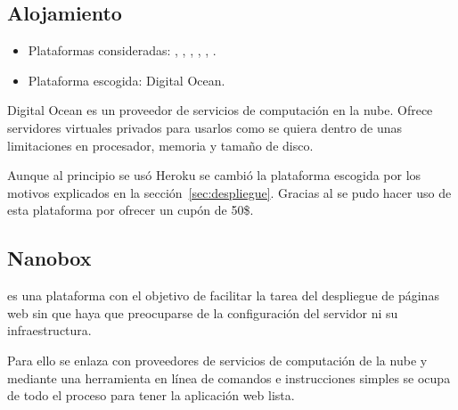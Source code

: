 \subsection{Alojamiento}

\begin{itemize}
	\tightlist
	\item Plataformas consideradas:
	,
	,
	,
	,
	,
	.
	\item Plataforma escogida: Digital Ocean.
\end{itemize}

Digital Ocean es un proveedor de servicios de computación en la nube. Ofrece
servidores virtuales privados para usarlos como se quiera dentro de unas
limitaciones en procesador, memoria y tamaño de disco.

Aunque al principio se usó Heroku se cambió la plataforma escogida por los
motivos explicados en la sección~\ref{sec:despliegue}. Gracias al
 se pudo
hacer uso de esta plataforma por ofrecer un cupón de 50\$.

\subsection{Nanobox}

 es una plataforma con el objetivo de
facilitar la tarea del despliegue de páginas web sin que haya que preocuparse de
la configuración del servidor ni su infraestructura.

Para ello se enlaza con proveedores de servicios de computación de la nube y
mediante una herramienta en línea de comandos e instrucciones simples se ocupa
de todo el proceso para tener la aplicación web lista.
